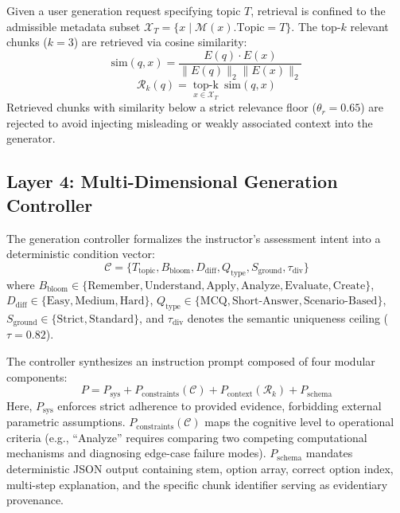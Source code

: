\documentclass[conference]{IEEEtran}
\begin{document}
Given a user generation request specifying topic $T$, retrieval is confined to the admissible metadata subset $\mathcal{X}_T = \{x \mid \mathcal{M}(x).\text{Topic} = T\}$. The top-$k$ relevant chunks ($k=3$) are retrieved via cosine similarity:
\begin{equation}
\text{sim}(q, x) = \frac{E(q) \cdot E(x)}{\|E(q)\|_2 \|E(x)\|_2}
\end{equation}
\begin{equation}
\mathcal{R}_k(q) = \operatorname*{top\text{-}k}_{x \in \mathcal{X}_T} \ \text{sim}(q, x)
\end{equation}
Retrieved chunks with similarity below a strict relevance floor ($\theta_r = 0.65$) are rejected to avoid injecting misleading or weakly associated context into the generator.

\subsection{Layer 4: Multi-Dimensional Generation Controller}
The generation controller formalizes the instructor's assessment intent into a deterministic condition vector:
\begin{equation}
\mathcal{C} = \{ T_{\text{topic}}, B_{\text{bloom}}, D_{\text{diff}}, Q_{\text{type}}, S_{\text{ground}}, \tau_{\text{div}} \}
\end{equation}
where $B_{\text{bloom}} \in \{\text{Remember}, \text{Understand}, \text{Apply}, \text{Analyze}, \text{Evaluate}, \text{Create}\}$, $D_{\text{diff}} \in \{\text{Easy}, \text{Medium}, \text{Hard}\}$, $Q_{\text{type}} \in \{\text{MCQ}, \text{Short-Answer}, \text{Scenario-Based}\}$, $S_{\text{ground}} \in \{\text{Strict}, \text{Standard}\}$, and $\tau_{\text{div}}$ denotes the semantic uniqueness ceiling ($\tau = 0.82$).

The controller synthesizes an instruction prompt composed of four modular components:
\begin{equation}
P = P_{\text{sys}} + P_{\text{constraints}}(\mathcal{C}) + P_{\text{context}}(\mathcal{R}_k) + P_{\text{schema}}
\end{equation}
Here, $P_{\text{sys}}$ enforces strict adherence to provided evidence, forbidding external parametric assumptions. $P_{\text{constraints}}(\mathcal{C})$ maps the cognitive level to operational criteria (e.g., ``Analyze'' requires comparing two competing computational mechanisms and diagnosing edge-case failure modes). $P_{\text{schema}}$ mandates deterministic JSON output containing stem, option array, correct option index, multi-step explanation, and the specific chunk identifier serving as evidentiary provenance.
\end{document}
